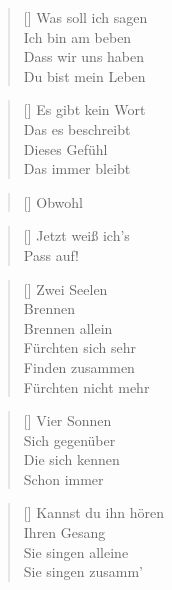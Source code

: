 \documentclass[twocolumn]{article}
\title{
	\vspace{-5cm}
	\begin{flushleft}
		\titlevar \quad \raisebox{0.15em}{\normalsize(\authorvar)}
	\end{flushleft}
	}
\date{
	\vspace{-1.2cm}
	\begin{flushleft}
		\datevar
	\end{flushleft} 
	}
\newenvironment{Strophe}{\begin{minipage}{\versewidth} \begin{verse}[\versewidth]}{\end{verse} \end{minipage}\vspace{0.5em}}
\begin{document}
	\maketitle
	\thispagestyle{empty}
	
	\begin{Strophe}
		Was soll ich sagen \\
		Ich bin am beben \\
		Dass wir uns haben \\
		Du bist mein Leben \\
	\end{Strophe}
	
	\begin{Strophe}	
		Es gibt kein Wort \\
		Das es beschreibt \\
		Dieses Gefühl \\
		Das immer bleibt \\
	\end{Strophe}
	
	\begin{Strophe}
		Obwohl
	\end{Strophe}
	
	\begin{Strophe}	
		Jetzt weiß ich's \\
		Pass auf! \\
	\end{Strophe}
	
	\begin{Strophe}	
		Zwei Seelen \\
		Brennen \\
		Brennen allein \\
		Fürchten sich sehr \\
		Finden zusammen \\
		Fürchten nicht mehr \\
	\end{Strophe}
	
	\begin{Strophe}	
		Vier Sonnen \\
		Sich gegenüber \\
		Die sich kennen \\
		Schon immer \\
	\end{Strophe}
	
	\begin{Strophe}	
		Kannst du ihn hören \\
		Ihren Gesang \\
		Sie singen alleine \\
		Sie singen zusamm' \\
	\end{Strophe}
	
\end{document}
